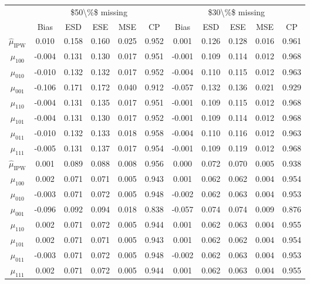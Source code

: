\documentclass[
]{article}
\begin{document}
\begin{table}[!h]
\centering
\begin{tabular}{ccccccccccc}
\toprule
\multicolumn{1}{c}{} & \multicolumn{5}{c}{\$50\textbackslash{}\%\$ missing} & \multicolumn{5}{c}{\$30\textbackslash{}\%\$ missing} \\
\cmidrule(l{3pt}r{3pt}){2-6} \cmidrule(l{3pt}r{3pt}){7-11}
 & Bias & ESD & ESE & MSE & CP & Bias & ESD & ESE & MSE & CP\\
\midrule
$\hat{\mu}_\text{IPW}$ & 0.010 & 0.158 & 0.160 & 0.025 & 0.952 & 0.001 & 0.126 & 0.128 & 0.016 & 0.961\\
$\hat{\mu}_{100}$ & -0.004 & 0.131 & 0.130 & 0.017 & 0.951 & -0.001 & 0.109 & 0.114 & 0.012 & 0.968\\
$\hat{\mu}_{010}$ & -0.010 & 0.132 & 0.132 & 0.017 & 0.952 & -0.004 & 0.110 & 0.115 & 0.012 & 0.963\\
$\hat{\mu}_{001}$ & -0.106 & 0.171 & 0.172 & 0.040 & 0.912 & -0.057 & 0.132 & 0.136 & 0.021 & 0.929\\
$\hat{\mu}_{110}$ & -0.004 & 0.131 & 0.135 & 0.017 & 0.951 & -0.001 & 0.109 & 0.115 & 0.012 & 0.968\\
$\hat{\mu}_{101}$ & -0.004 & 0.131 & 0.130 & 0.017 & 0.952 & -0.001 & 0.109 & 0.114 & 0.012 & 0.968\\
$\hat{\mu}_{011}$ & -0.010 & 0.132 & 0.133 & 0.018 & 0.958 & -0.004 & 0.110 & 0.116 & 0.012 & 0.963\\
$\hat{\mu}_{111}$ & -0.005 & 0.131 & 0.137 & 0.017 & 0.954 & -0.001 & 0.109 & 0.119 & 0.012 & 0.968\\
$\hat{\mu}_\text{IPW}$ & 0.001 & 0.089 & 0.088 & 0.008 & 0.956 & 0.000 & 0.072 & 0.070 & 0.005 & 0.938\\
$\hat{\mu}_{100}$ & 0.002 & 0.071 & 0.071 & 0.005 & 0.943 & 0.001 & 0.062 & 0.062 & 0.004 & 0.954\\
$\hat{\mu}_{010}$ & -0.003 & 0.071 & 0.072 & 0.005 & 0.948 & -0.002 & 0.062 & 0.063 & 0.004 & 0.953\\
$\hat{\mu}_{001}$ & -0.096 & 0.092 & 0.094 & 0.018 & 0.838 & -0.057 & 0.074 & 0.074 & 0.009 & 0.876\\
$\hat{\mu}_{110}$ & 0.002 & 0.071 & 0.072 & 0.005 & 0.944 & 0.001 & 0.062 & 0.063 & 0.004 & 0.955\\
$\hat{\mu}_{101}$ & 0.002 & 0.071 & 0.071 & 0.005 & 0.943 & 0.001 & 0.062 & 0.062 & 0.004 & 0.954\\
$\hat{\mu}_{011}$ & -0.003 & 0.071 & 0.072 & 0.005 & 0.948 & -0.002 & 0.062 & 0.063 & 0.004 & 0.953\\
$\hat{\mu}_{111}$ & 0.002 & 0.071 & 0.072 & 0.005 & 0.944 & 0.001 & 0.062 & 0.063 & 0.004 & 0.955\\
\bottomrule
\end{tabular}
\end{table}
\end{document}
